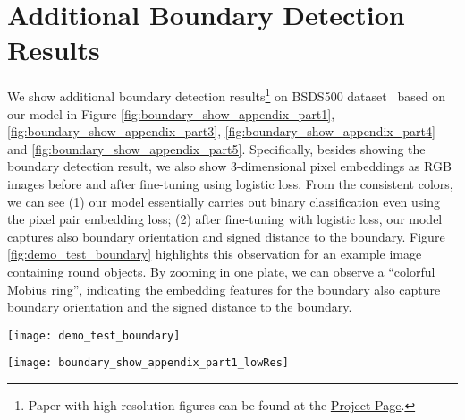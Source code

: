 \section{Additional Boundary Detection Results}

We show additional boundary detection results\footnote{Paper with high-resolution figures can be found at the
\href{http://www.ics.uci.edu/~skong2/SMMMSG.html}{Project Page}.} on BSDS500
dataset~\cite{arbelaez2011contour} based on our model in Figure
\ref{fig:boundary_show_appendix_part1},
\ref{fig:boundary_show_appendix_part3},
\ref{fig:boundary_show_appendix_part4}
and \ref{fig:boundary_show_appendix_part5}.
Specifically, besides showing the boundary detection result, we also show
3-dimensional pixel embeddings as RGB images before and after fine-tuning using
logistic loss.  From the consistent colors, we can see (1) our model
essentially carries out binary classification even using the pixel pair
embedding loss; (2) after fine-tuning with logistic loss, our model captures
also boundary orientation and signed distance to the boundary.  Figure
\ref{fig:demo_test_boundary} highlights this observation for an example image
containing round objects.  By zooming in one plate, we can observe a ``colorful
Mobius ring'', indicating the embedding features for the boundary also capture
boundary orientation and the signed distance to the boundary.

\begin{figure*}[t]
\centering
   \texttt{[image: demo\_test\_boundary]}
   \vspace{-3mm}
   \caption{An image highlighting the structure of the embedding for an image
   with circular boundaries. We observe a ``Mobius effect'' where the embedding
   encodes both the orientation and distance to the boundary.}
\label{fig:demo_test_boundary}
\end{figure*}

\begin{figure*}[t]
\centering
   \texttt{[image: boundary\_show\_appendix\_part1\_lowRes]}
   \vspace{-3mm}
   \caption{Visualization for boundary detection (part-$1/5$).
   Images are randomly selected from BSDS500 test set.  For each image, we show
   the embedding vectors  at different layers from the model before and after
   fine-tuning using logistic loss.  We can see that the boundary embedding
   vectors after fine-tuning not only highlights the boundary pixels, but also
   captures to some extent the edge orientation and distance from the colors
   conveyed.
   }
\label{fig:boundary_show_appendix_part1}
\end{figure*}

